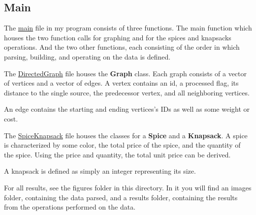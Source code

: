 \documentclass[12pt, letterpaper]{article}
\begin{document}
\subsection{Main}
The \underline{main} file in my program consists of three functions.
The main function which houses the two function calls for graphing and for the spices and knapsacks operations.
And the two other functions, each consisting of the order in which parsing, building, and operating on the data is defined.
\begin{center}
   
\end{center}
The \underline{DirectedGraph} file houses the \textbf{Graph} class.
Each graph consists of a vector of vertices and a vector of edges.
A vertex contains an id, a processed flag, its distance to the single source, the predecessor vertex, and all neighboring vertices.
\begin{center}
   
\end{center}
An edge contains the starting and ending vertices's IDs as well as some weight or cost.
\begin{center}
   
\end{center}
The \underline{SpiceKnapsack} file houses the classes for a \textbf{Spice} and a \textbf{Knapsack}.
A spice is characterized by some color, the total price of the spice, and the quantity of the spice.
Using the price and quantity, the total unit price can be derived.
\begin{center}
   
\end{center}
A knapsack is defined as simply an integer representing its size.
\begin{center}
   
\end{center}
For all results, see the figures folder in this directory.
In it you will find an images folder, containing the data parsed, and a results folder, containing the results from the operations performed on the data.
\end{document}
